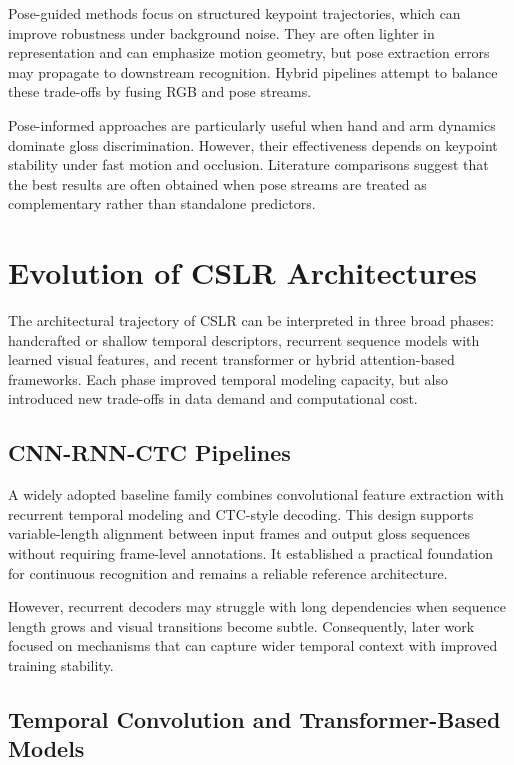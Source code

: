 Pose-guided methods focus on structured keypoint trajectories, which can improve robustness under background noise. They are often lighter in representation and can emphasize motion geometry, but pose extraction errors may propagate to downstream recognition. Hybrid pipelines attempt to balance these trade-offs by fusing RGB and pose streams.

Pose-informed approaches are particularly useful when hand and arm dynamics dominate gloss discrimination. However, their effectiveness depends on keypoint stability under fast motion and occlusion. Literature comparisons suggest that the best results are often obtained when pose streams are treated as complementary rather than standalone predictors.

\section{Evolution of CSLR Architectures}

The architectural trajectory of CSLR can be interpreted in three broad phases: handcrafted or shallow temporal descriptors, recurrent sequence models with learned visual features, and recent transformer or hybrid attention-based frameworks. Each phase improved temporal modeling capacity, but also introduced new trade-offs in data demand and computational cost.

\subsection{CNN-RNN-CTC Pipelines}

A widely adopted baseline family combines convolutional feature extraction with recurrent temporal modeling and CTC-style decoding. This design supports variable-length alignment between input frames and output gloss sequences without requiring frame-level annotations. It established a practical foundation for continuous recognition and remains a reliable reference architecture.

However, recurrent decoders may struggle with long dependencies when sequence length grows and visual transitions become subtle. Consequently, later work focused on mechanisms that can capture wider temporal context with improved training stability.

\subsection{Temporal Convolution and Transformer-Based Models}

